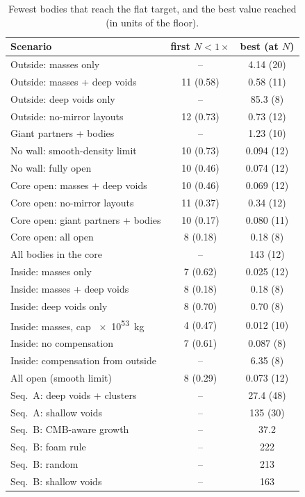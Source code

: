 \documentclass[aps,prd,twocolumn,nofootinbib,superscriptaddress,floatfix]{revtex4-2}
\begin{document}
\begin{table}[tbp]
\caption{Fewest bodies that reach the flat target, and the best value reached (in units of the floor).}
\label{tab:key}
\footnotesize
\begin{ruledtabular}
\begin{tabular}{lcc}
Scenario & first $N<1\times$ & best (at $N$)\\
\midrule
Outside: masses only & -- & 4.14 (20)\\
Outside: masses + deep voids & 11 (0.58) & 0.58 (11)\\
Outside: deep voids only & -- & 85.3 (8)\\
Outside: no-mirror layouts & 12 (0.73) & 0.73 (12)\\
Giant partners + bodies & -- & 1.23 (10)\\
No wall: smooth-density limit & 10 (0.73) & 0.094 (12)\\
No wall: fully open & 10 (0.46) & 0.074 (12)\\
Core open: masses + deep voids & 10 (0.46) & 0.069 (12)\\
Core open: no-mirror layouts & 11 (0.37) & 0.34 (12)\\
Core open: giant partners + bodies & 10 (0.17) & 0.080 (11)\\
Core open: all open & 8 (0.18) & 0.18 (8)\\
All bodies in the core & -- & 143 (12)\\
Inside: masses only & 7 (0.62) & 0.025 (12)\\
Inside: masses + deep voids & 8 (0.18) & 0.18 (8)\\
Inside: deep voids only & 8 (0.70) & 0.70 (8)\\
Inside: masses, cap \SI{e53}{\kilo\gram} & 4 (0.47) & 0.012 (10)\\
Inside: no compensation & 7 (0.61) & 0.087 (8)\\
Inside: compensation from outside & -- & 6.35 (8)\\
All open (smooth limit) & 8 (0.29) & 0.073 (12)\\
Seq.\ A: deep voids + clusters & -- & 27.4 (48)\\
Seq.\ A: shallow voids & -- & 135 (30)\\
Seq.\ B: CMB-aware growth & -- & 37.2\\
Seq.\ B: foam rule & -- & 222\\
Seq.\ B: random & -- & 213\\
Seq.\ B: shallow voids & -- & 163\\
\end{tabular}
\end{ruledtabular}
\end{table}
\end{document}
